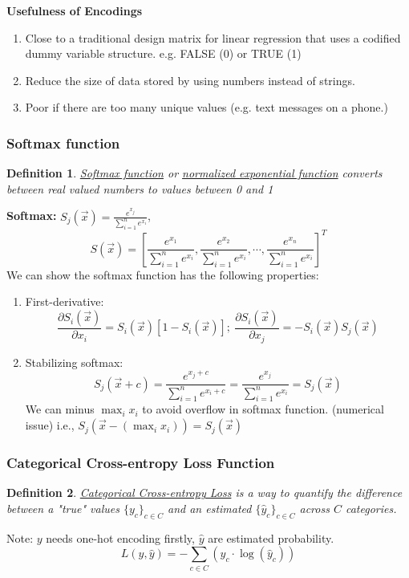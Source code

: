 \documentclass[11pt,a4paper]{article}
\newtheorem{definition}{Definition}
\begin{document}
\textbf{Usefulness of Encodings}
\begin{enumerate}
    \item Close to a traditional design matrix for linear regression that uses a codified dummy variable structure. e.g. FALSE (0) or TRUE (1)
    \item Reduce the size of data stored by using numbers instead of
    strings.
    \item Poor if there are too many unique values (e.g. text messages on a phone.)
\end{enumerate}




\subsubsection{Softmax function}
\begin{definition}
    \underline{Softmax function} or \underline{normalized exponential function} converts between real valued numbers to values between 0 and 1
\end{definition}
\textbf{Softmax:} $S_j(\vec{x})=\frac{e^{x_j}}{\sum_{i=1}^ne^{x_i}}$, $$S(\vec{x})=\left[\frac{e^{x_1}}{\sum_{i=1}^ne^{x_i}},\frac{e^{x_2}}{\sum_{i=1}^ne^{x_i}},\cdots, \frac{e^{x_n}}{\sum_{i=1}^ne^{x_i}}\right]^T$$
We can show the softmax function has the following properties:
\begin{enumerate}[(1)]
    \item First-derivative: $$\frac{\partial S_i(\vec{x})}{\partial x_i}=S_i(\vec{x})[1-S_i(\vec{x})];\ \frac{\partial S_i(\vec{x})}{\partial x_j}=-S_i(\vec{x})S_j(\vec{x})$$
    \item Stabilizing softmax: $$S_j(\vec{x}+c)=\frac{e^{x_j+c}}{\sum_{i=1}^ne^{x_i+c}}=\frac{e^{x_j}}{\sum_{i=1}^ne^{x_i}}=S_j(\vec{x})$$
    We can minus $\max_{i} x_i$ to avoid overflow in softmax function. (numerical issue) i.e., $S_j(\vec{x}-(\max_{i} x_i))=S_j(\vec{x})$
\end{enumerate}

\subsubsection{Categorical Cross-entropy Loss Function}
\begin{definition}
    \underline{Categorical Cross-entropy Loss} is a way to quantify the difference between a "true" values $\{y_c\}_{c\in C}$ and an estimated $\{\hat{y}_c\}_{c\in C}$ across $C$ categories.
\end{definition}
Note: $y$ needs one-hot encoding firstly, $\hat{y}$ are estimated probability.
$$L(y,\hat{y})=-\sum_{c\in C}\left(y_c\cdot \log(\hat{y}_c)\right)$$
\end{document}
